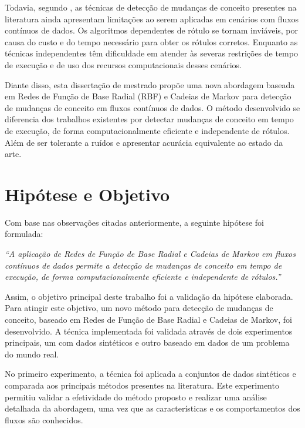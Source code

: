 \documentclass[msc, classic, a4paper]{ufbathesis}
\begin{document}
Todavia, segundo ,
as técnicas de detecção de mudanças de conceito presentes na literatura ainda apresentam limitações ao serem aplicadas em cenários com fluxos contínuos de dados.
%
Os algoritmos dependentes de rótulo se tornam inviáveis, por causa do custo e do tempo necessário para obter os rótulos corretos.
%
Enquanto as técnicas independentes têm dificuldade em atender às severas restrições de tempo de execução e de uso dos recursos computacionais desses cenários.

Diante disso, esta dissertação de mestrado propõe uma nova abordagem baseada em Redes de Função de Base Radial (RBF) e Cadeias de Markov
para detecção de mudanças de conceito em fluxos contínuos de dados.
O método desenvolvido se diferencia dos trabalhos existentes por detectar mudanças de conceito em tempo de execução,
de forma computacionalmente eficiente e independente de rótulos.
Além de ser tolerante a ruídos e apresentar acurácia equivalente ao estado da arte.

\section{Hipótese e Objetivo}

Com base nas observações citadas anteriormente, a seguinte hipótese foi formulada:

\begin{center}
\textit{``A aplicação de Redes de Função de Base Radial e Cadeias de Markov em fluxos contínuos de dados permite a detecção de mudanças de conceito em tempo de execução, de forma computacionalmente eficiente e independente de rótulos.''}
\end{center}

Assim, o objetivo principal deste trabalho foi a validação da hipótese elaborada.
Para atingir este objetivo, um novo método para detecção de mudanças de conceito, baseado em Redes de Função de Base Radial e Cadeias de Markov, foi desenvolvido.
A técnica implementada foi validada através de dois experimentos principais, um com dados sintéticos e outro baseado em dados de um problema do mundo real.

No primeiro experimento, a técnica foi aplicada a conjuntos de dados sintéticos e
comparada aos principais métodos presentes na literatura.
Este experimento permitiu validar a efetividade do método proposto e realizar uma análise detalhada da abordagem,
uma vez que as características e os comportamentos dos fluxos são conhecidos.
\end{document}
